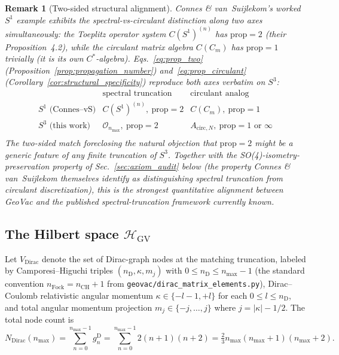 \documentclass[11pt]{article}
\newtheorem{remark}{Remark}
\begin{document}
\begin{remark}[Two-sided structural alignment]
\label{rem:two_sided_alignment}
Connes \& van~Suijlekom's worked $S^1$ example exhibits the
spectral-vs-circulant distinction along two axes simultaneously:
the Toeplitz operator system $C(S^1)^{(n)}$ has $\mathrm{prop} = 2$
(their Proposition~4.2), while the circulant matrix algebra
$C(C_m)$ has $\mathrm{prop} = 1$ trivially (it is its own
$C^*$-algebra).  Eqs.~\eqref{eq:prop_two}
(Proposition~\ref{prop:propagation_number}) and~\eqref{eq:prop_circulant}
(Corollary~\ref{cor:structural_specificity}) reproduce both axes
verbatim on $S^3$:
\[
\renewcommand{\arraystretch}{1.15}
\begin{array}{c|c|c}
 & \text{spectral truncation} & \text{circulant analog} \\ \hline
S^1 \text{ (Connes--vS)} & C(S^1)^{(n)},\ \mathrm{prop} = 2 &
   C(C_m),\ \mathrm{prop} = 1 \\
S^3 \text{ (this work)}  & \mathcal{O}_{n_{\max}},\ \mathrm{prop} = 2 &
   A_{\mathrm{circ}, N},\ \mathrm{prop} = 1 \text{ or } \infty \\
\end{array}
\]
The two-sided match foreclosing the natural objection that
$\mathrm{prop} = 2$ might be a generic feature of any finite
truncation of $S^3$.  Together with the SO(4)-isometry-preservation
property of Sec.~\ref{sec:axiom_audit} below (the property Connes
\& van~Suijlekom themselves identify as distinguishing spectral
truncation from circulant discretization), this is the strongest
quantitative alignment between GeoVac and the published
spectral-truncation framework currently known.
\end{remark}

\subsection{The Hilbert space $\mathcal{H}_{\mathrm{GV}}$}

Let $V_{\mathrm{Dirac}}$ denote the set of Dirac-graph nodes at the
matching truncation, labeled by Camporesi--Higuchi triples
$(n_{\mathrm{D}}, \kappa, m_j)$ with $0 \le n_{\mathrm{D}} \le
n_{\max} - 1$ (the standard convention $n_{\mathrm{Fock}} = n_{\mathrm{CH}}
+ 1$ from \texttt{geovac/dirac\_matrix\_elements.py}), Dirac--Coulomb
relativistic angular momentum $\kappa \in \{-l-1, +l\}$ for each
$0 \le l \le n_{\mathrm{D}}$, and total angular momentum projection
$m_j \in \{-j, \ldots, j\}$ where $j = |\kappa| - 1/2$.  The total
node count is
\[
   N_{\mathrm{Dirac}}(n_{\max}) = \sum_{n=0}^{n_{\max}-1}
     g_n^{\mathrm{D}} = \sum_{n=0}^{n_{\max}-1} 2(n+1)(n+2)
   = \tfrac{2}{3} n_{\max}(n_{\max}+1)(n_{\max}+2).
\]
\end{document}
